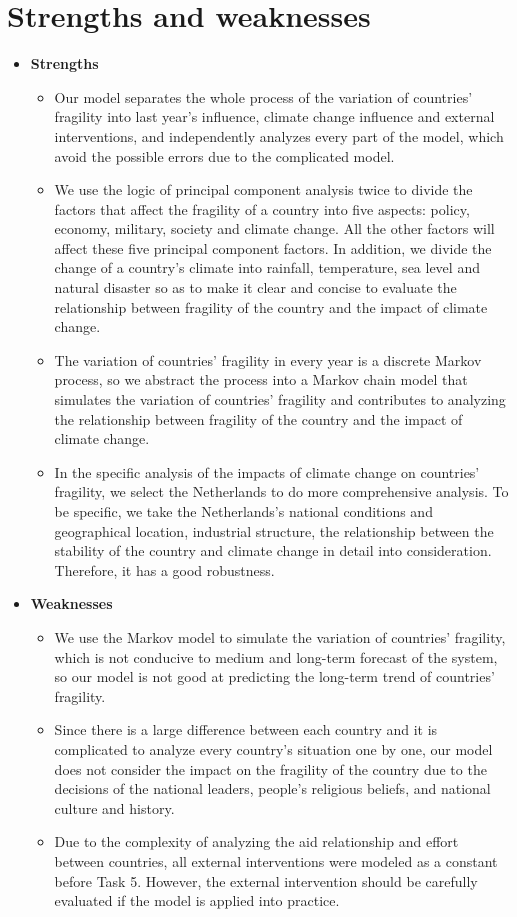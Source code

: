 \documentclass{mcmthesis}
\begin{document}
	\section{Strengths and weaknesses}
	\begin{itemize}
		\item \large{\textbf{Strengths}}
		\begin{itemize}
			\item Our model separates the whole process of the variation of countries' fragility into last year's influence, climate change influence and external interventions, and independently analyzes every part of the model, which avoid the possible errors due to the complicated model.
			\item We use the logic of principal component analysis twice to divide the factors that affect the fragility of a country into five aspects: policy, economy, military, society and climate change. All the other factors will affect these five principal component factors. In addition, we divide the change of a country's climate into rainfall, temperature, sea level and natural disaster so as to make it clear and concise to evaluate the relationship between fragility of the country and the impact of climate change.
			\item The variation of countries' fragility in every year is a discrete Markov process, so we abstract the process into a Markov chain model that simulates the variation of countries' fragility and contributes to analyzing the relationship between fragility of the country and the impact of climate change.		
			\item In the specific analysis of the impacts of climate change on countries' fragility, we select the Netherlands to do more comprehensive analysis. To be specific, we take the Netherlands's national conditions and geographical location, industrial structure, the relationship between the stability of the country and climate change in detail into consideration. Therefore, it has a good robustness.	
		\end{itemize}

		\item \large{\textbf{Weaknesses}}
			\begin{itemize}
				\item We use the Markov model to simulate the variation of countries' fragility, which is not conducive to medium and long-term forecast of the system, so our model is not good at predicting the long-term trend of countries' fragility.
				\item Since there is a large difference between each country and it is complicated to analyze every country's situation one by one, our model does not consider the impact on the fragility of the country due to the decisions of the national leaders, people's religious beliefs, and national culture and history.
				\item Due to the complexity of analyzing the aid relationship and effort between countries, all external interventions were modeled as a constant before Task 5. However, the external intervention should be carefully evaluated if the model is applied into practice.
			\end{itemize}
	\end{itemize}
\end{document}
